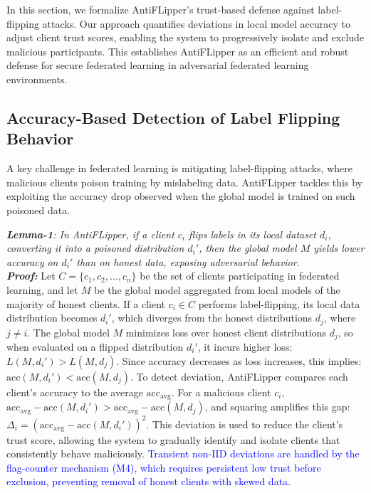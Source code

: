 \documentclass[conference]{IEEEtran}
\begin{document}
In this section, we formalize AntiFLipper’s trust-based defense against label-flipping attacks. Our approach quantifies deviations in local model accuracy to adjust client trust scores, enabling the system to progressively isolate and exclude malicious participants. This establishes AntiFLipper as an efficient and robust defense for secure federated learning in adversarial federated learning environments.

\subsection{Accuracy-Based Detection of Label Flipping Behavior} A key challenge in federated learning is mitigating label-flipping attacks, where malicious clients poison training by mislabeling data. AntiFLipper tackles this by exploiting the accuracy drop observed when the global model is trained on such poisoned data.

\textit{\textbf{Lemma-1}: In AntiFLipper, if a client \( c_i \) flips labels in its local dataset \( d_i \), converting it into a poisoned distribution \( d_i' \), then the global model \( M \) yields lower accuracy on \( d_i' \) than on honest data, exposing adversarial behavior.} \\

\textit{\textbf{Proof:}} Let \( C = \{c_1, c_2, \ldots, c_n\} \) be the set of clients participating in federated learning, and let \( M \) be the global model aggregated from local models of the majority of honest clients. If a client \( c_i \in C \) performs label-flipping, its local data distribution becomes \( d_i' \), which diverges from the honest distributions \( d_j \), where \( j \neq i \). The global model \( M \) minimizes loss over honest client distributions \( d_j \), so when evaluated on a flipped distribution \( d_i' \), it incurs higher loss: \(L(M, d_i') > L(M, d_j).\) Since accuracy decreases as loss increases, this implies: \(\text{acc}(M, d_i') < \text{acc}(M, d_j).\) To detect deviation, AntiFLipper compares each client’s accuracy to the average \( \text{acc}_{\text{avg}} \). For a malicious client \( c_i \), \( \text{acc}_{\text{avg}} - \text{acc}(M, d_i') > \text{acc}_{\text{avg}} - \text{acc}(M, d_j) \), and squaring amplifies this gap: \( \Delta_i = (\text{acc}_{\text{avg}} - \text{acc}(M, d_i'))^2 \). This deviation is used to reduce the client's trust score, allowing the system to gradually identify and isolate clients that consistently behave maliciously.
\textcolor{blue}{Transient non-IID deviations are handled by the flag-counter mechanism (M4), which requires persistent low trust before exclusion, preventing removal of honest clients with skewed data.}
\end{document}
